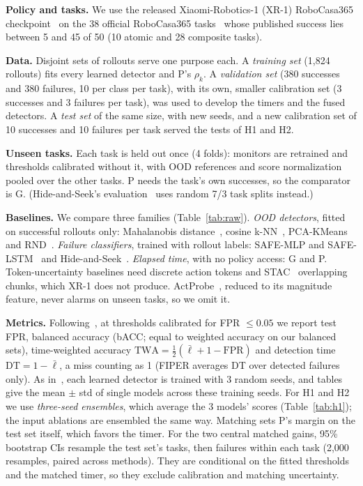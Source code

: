 \documentclass[conference]{IEEEtran}
\begin{document}
\textbf{Policy and tasks.} We use the released Xiaomi-Robotics-1 (XR-1) RoboCasa365
checkpoint~\cite{xiaomi2026robotics} on the 38 official RoboCasa365
tasks~\cite{nasiriany2024robocasa,robocasa365} whose published success lies between 5 and 45 of
50 (10 atomic and 28 composite tasks).

\textbf{Data.} Disjoint sets of rollouts serve one purpose each. A \emph{training set} (1,824
rollouts) fits every learned detector and P's $\rho_k$. A \emph{validation set} (380 successes
and 380 failures, 10 per class per task), with its own, smaller calibration set (3 successes and 3
failures per task), was used to develop the timers and the fused detectors. A \emph{test set} of
the same size, with new seeds, and a new calibration set of 10 successes and 10 failures per
task served the tests of H1 and H2.

\textbf{Unseen tasks.} Each task is held out once (4 folds): monitors are retrained and
thresholds calibrated without it, with OOD references and score normalization pooled over the
other tasks. P needs the task's own successes, so the comparator is G. (Hide-and-Seek's
evaluation~\cite{park2026hideseek} uses random 7/3 task splits instead.)

\textbf{Baselines.} We compare three families (Table~\ref{tab:raw}).
\emph{OOD detectors}, fitted on successful rollouts only: Mahalanobis
distance~\cite{lee2018mahalanobis}, cosine k-NN~\cite{sun2022knn},
PCA-KMeans~\cite{liu2024siriusfleet} and RND~\cite{he2024rediffuser}. \emph{Failure
classifiers}, trained with rollout labels: SAFE-MLP and SAFE-LSTM~\cite{gu2025safe} and
Hide-and-Seek~\cite{park2026hideseek}. \emph{Elapsed
time}, with no policy access: G and P. Token-uncertainty baselines need discrete action tokens
and STAC~\cite{agia2024sentinel} overlapping chunks, which XR-1 does not produce. ActProbe~\cite{huang2026actprobe},
reduced to its magnitude feature, never alarms on unseen tasks, so we omit it.

\textbf{Metrics.} Following~\cite{romer2025fiper,park2026hideseek}, at thresholds calibrated for
FPR $\le 0.05$ we report test FPR, balanced accuracy (bACC; equal to weighted accuracy on our
balanced sets), time-weighted accuracy $\mathrm{TWA} = \frac{1}{2}(\bar\ell + 1 -
\mathrm{FPR})$ and detection time $\mathrm{DT} = 1 - \bar\ell$, a miss counting as 1 (FIPER averages DT
over detected failures only). As
in~\cite{park2026hideseek}, each learned detector is trained with 3 random seeds, and tables give
the mean $\pm$ std of single models across these training seeds. For H1 and H2 we use
\emph{three-seed ensembles}, which average the 3 models' scores (Table~\ref{tab:h1}); the input
ablations are ensembled the same way. Matching sets P's margin on the test set itself, which
favors the timer. For
the two central matched gains, 95\% bootstrap CIs resample the test set's tasks, then failures
within each task (2,000 resamples, paired across methods). They are conditional on the fitted
thresholds and the matched timer, so they exclude calibration and matching uncertainty.
\end{document}
